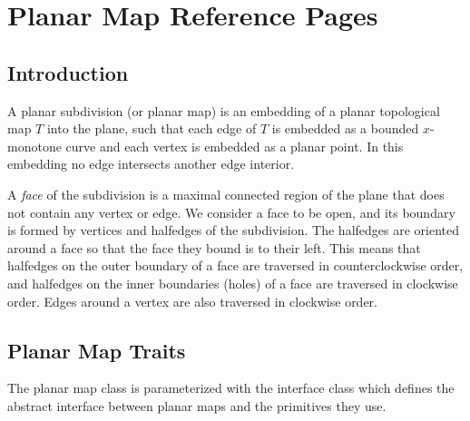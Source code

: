 


\clearpage
\section{Planar Map Reference Pages}
\subsection*{Introduction}

A planar subdivision (or planar map) is an embedding of a planar 
topological map $T$ 
into the plane, such that each edge of $T$ is embedded as a
bounded $x$-monotone curve and each vertex is embedded as a planar point.
In this embedding no
edge intersects another edge interior.

A {\em face} of the subdivision is a maximal connected region of the
plane that does not contain any vertex or edge. 
We consider a face to be open, and its boundary is
formed by vertices and halfedges of the subdivision.
The halfedges are oriented around a face so that the face they bound
is to their left. This means that halfedges on the outer boundary
of a face are traversed in counterclockwise order, and halfedges on the inner
boundaries (holes) of a face are traversed in clockwise order. Edges around a
vertex are also traversed in clockwise order. 

\subsection*{Planar Map Traits}
The planar map class is parameterized with the
interface class  which defines the abstract interface
between planar maps and the primitives they use. 

